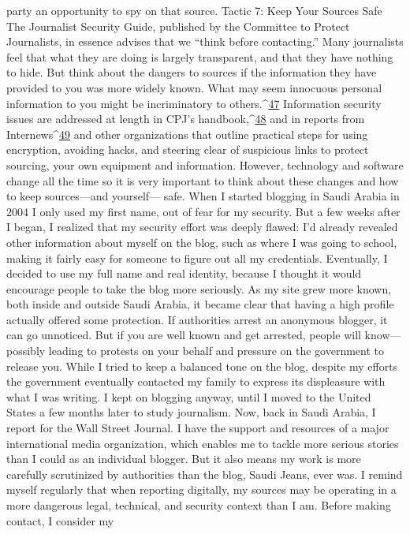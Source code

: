 party an opportunity to spy on that source.
Tactic 7: Keep Your Sources Safe
The Journalist Security Guide, published by the Committee to Protect Journalists, in
essence advises that we ``think before contacting.''
Many journalists feel that what they are doing is largely transparent, and that they
have nothing to hide. But think about the dangers to sources if the information they
have provided to you was more widely known. What may seem innocuous personal
information to you might be incriminatory to others.^{\href{#endnotes}{47}}
Information security issues are addressed at length in CPJ’s handbook,^{\href{#endnotes}{48}} and in reports
from Internews^{\href{#endnotes}{49}} and other organizations that outline practical steps for using encryption,
avoiding hacks, and steering clear of suspicious links to protect sourcing, your own
equipment and information. However, technology and software change all the time so it
is very important to think about these changes and how to keep sources—and yourself—
safe.
When I started blogging in Saudi Arabia in 2004 I only used my first name, out of fear
for my security. But a few weeks after I began, I realized that my security effort was
deeply flawed: I’d already revealed other information about myself on the blog, such as
where I was going to school, making it fairly easy for someone to figure out all my
credentials. Eventually, I decided to use my full name and real identity, because I thought
it would encourage people to take the blog more seriously.
As my site grew more known, both inside and outside Saudi Arabia, it became clear that
having a high profile actually offered some protection. If authorities arrest an anonymous
blogger, it can go unnoticed. But if you are well known and get arrested, people will
know—possibly leading to protests on your behalf and pressure on the government to
release you. While I tried to keep a balanced tone on the blog, despite my efforts the
government eventually contacted my family to express its displeasure with what I was
writing. I kept on blogging anyway, until I moved to the United States a few months later
to study journalism.
Now, back in Saudi Arabia, I report for the Wall Street Journal. I have the support and
resources of a major international media organization, which enables me to tackle more
serious stories than I could as an individual blogger. But it also means my work is more
carefully scrutinized by authorities than the blog, Saudi Jeans, ever was. I remind myself
regularly that when reporting digitally, my sources may be operating in a more dangerous
legal, technical, and security context than I am. Before making contact, I consider my
